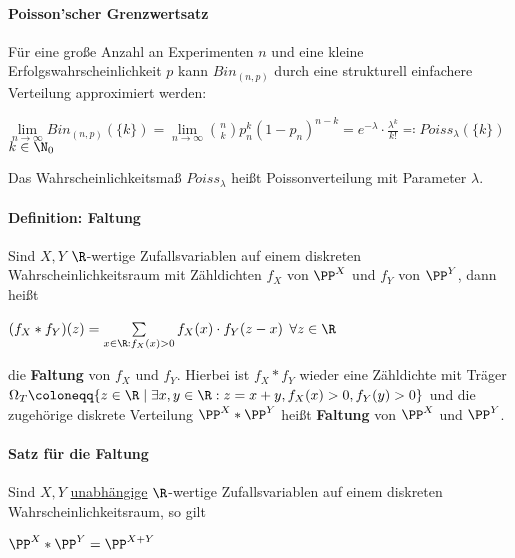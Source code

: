 \paragraph{Poisson'scher Grenzwertsatz}
Für eine große Anzahl an Experimenten $n$ und eine kleine Erfolgswahrscheinlichkeit $p$ kann $Bin_{(n,p)}$ durch eine strukturell einfachere Verteilung approximiert werden:
\begin{tightcenter}
	$\lim\limits_{n\rightarrow\infty}Bin_{(n,p)}(\{k\})=\lim\limits_{n\rightarrow\infty}\binom{n}{k}p_n^k(1-p_n)^{n-k}=e^{-\lambda}\cdot\frac{\lambda^k}{k!}\eqqcolon Poiss_\lambda(\{k\})$ \qquad$k\in\N_0$
\end{tightcenter}
Das Wahrscheinlichkeitsmaß $Poiss_\lambda$ heißt Poissonverteilung mit Parameter $\lambda$.

\paragraph{Definition: Faltung}
Sind $X,Y$ $\R$-wertige Zufallsvariablen auf einem diskreten Wahrscheinlichkeitsraum mit Zähldichten $f_X$ von $\PP^X$ und $f_Y$ von $\PP^Y$, dann heißt
\begin{tightcenter}
	$(f_X*f_Y)(z)=\sum\limits_{x\in\R:f_X(x)>0}f_X(x)\cdot f_Y(z-x)$ \qquad$\forall z\in\R$
\end{tightcenter}
die \textbf{Faltung} von $f_X$ und $f_Y$.
Hierbei ist $f_X*f_Y$ wieder eine Zähldichte mit Träger $\Omega_T\coloneqq\{z\in\R\mid\exists x,y\in\R:z=x+y,f_X(x)>0, f_Y(y)>0\}$ und die zugehörige diskrete Verteilung $\PP^X*\PP^Y$ heißt \textbf{Faltung} von $\PP^X$ und $\PP^Y$.

\paragraph{Satz für die Faltung}
Sind $X,Y$ \underline{unabhängige} $\R$-wertige Zufallsvariablen auf einem diskreten Wahrscheinlichkeitsraum, so gilt
\begin{tightcenter}
	$\PP^X*\PP^Y=\PP^{X+Y}$
\end{tightcenter}